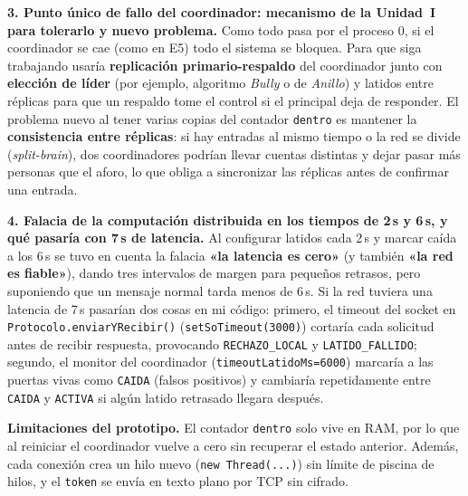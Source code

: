 \documentclass[10pt,a4paper]{article}
\begin{document}
\textbf{3. Punto único de fallo del coordinador: mecanismo de la Unidad~I para tolerarlo y nuevo problema.}
Como todo pasa por el proceso 0, si el coordinador se cae (como en E5) todo el sistema se bloquea. Para que siga trabajando usaría \textbf{replicación primario-respaldo} del coordinador junto con \textbf{elección de líder} (por ejemplo, algoritmo \emph{Bully} o de \emph{Anillo}) y latidos entre réplicas para que un respaldo tome el control si el principal deja de responder. El problema nuevo al tener varias copias del contador \texttt{dentro} es mantener la \textbf{consistencia entre réplicas}: si hay entradas al mismo tiempo o la red se divide (\emph{split-brain}), dos coordinadores podrían llevar cuentas distintas y dejar pasar más personas que el aforo, lo que obliga a sincronizar las réplicas antes de confirmar una entrada.

\textbf{4. Falacia de la computación distribuida en los tiempos de 2\,s y 6\,s, y qué pasaría con 7\,s de latencia.}
Al configurar latidos cada 2\,s y marcar caída a los 6\,s se tuvo en cuenta la falacia \textbf{«la latencia es cero»} (y también \textbf{«la red es fiable»}), dando tres intervalos de margen para pequeños retrasos, pero suponiendo que un mensaje normal tarda menos de 6\,s. Si la red tuviera una latencia de 7\,s pasarían dos cosas en mi código: primero, el timeout del socket en \texttt{Protocolo.enviarYRecibir()} (\texttt{setSoTimeout(3000)}) cortaría cada solicitud antes de recibir respuesta, provocando \texttt{RECHAZO\_LOCAL} y \texttt{LATIDO\_FALLIDO}; segundo, el monitor del coordinador (\texttt{timeoutLatidoMs=6000}) marcaría a las puertas vivas como \texttt{CAIDA} (falsos positivos) y cambiaría repetidamente entre \texttt{CAIDA} y \texttt{ACTIVA} si algún latido retrasado llegara después.

\medskip
\noindent\textbf{Limitaciones del prototipo.}
El contador \texttt{dentro} solo vive en RAM, por lo que al reiniciar el coordinador vuelve a cero sin recuperar el estado anterior. Además, cada conexión crea un hilo nuevo (\texttt{new Thread(...)}) sin límite de piscina de hilos, y el \texttt{token} se envía en texto plano por TCP sin cifrado.
\end{document}
